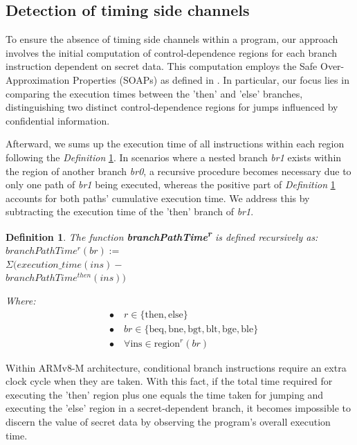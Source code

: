 \subsection{Detection of timing side channels}

To ensure the absence of timing side channels within a program, our approach involves the initial computation of control-dependence regions for each branch instruction dependent on secret data. This computation employs the Safe Over-Approximation Properties (SOAPs) as defined in \cite{MantelAVR}. In particular, our focus lies in comparing the execution times between the 'then' and 'else' branches, distinguishing two distinct control-dependence regions for jumps influenced by confidential information.

Afterward, we sums up the execution time of all instructions within each region following the \textit{Definition} \ref{def:timing}. In scenarios where a nested branch \textit{br1} exists within the region of another branch \textit{br0}, a recursive procedure becomes necessary due to only one path of \textit{br1} being executed, whereas the positive part of \textit{Definition} \ref{def:timing} accounts for both paths' cumulative execution time. We address this by subtracting the execution time of the 'then' branch of \textit{br1}.

\newtheorem{definition}{Definition}[section]
\begin{definition}\label{def:timing}
    The function \textbf{branchPathTime\textsuperscript{r}} is defined recursively as: \\
   
   \noindent 
   $branchPathTime^r(br) := $ \\
     $\Sigma (execution\_time(ins) -$ \\
     $ branchPathTime^{then}(ins))$

   Where:
\begin{align*}
& \bullet \quad r \in \{ \text{then}, \text{else} \} \\
& \bullet \quad br \in \{ \text{beq}, \text{bne}, \text{bgt}, \text{blt}, \text{bge}, \text{ble} \} \\
& \bullet \quad \forall \text{ins} \in \text{region}^r(br)
\end{align*}

\end{definition}

Within ARMv8-M architecture, conditional branch instructions require an extra clock cycle when they are taken. With this fact, if the total time required for executing the 'then' region plus one equals the time taken for jumping and executing the 'else' region in a secret-dependent branch, it becomes impossible to discern the value of secret data by observing the program's overall execution time.

